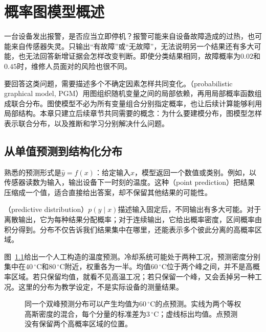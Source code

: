 \chapter{概率图模型概述}
\label{chap:pgm-overview}

一台设备发出报警，是否应当立即停机？报警可能来自设备故障造成的过热，也可能来自传感器失灵。只输出“有故障”或“无故障”，无法说明另一个结果还有多大可能，也无法回答新增证据会怎样改变判断。即使分类结果相同，故障概率为$0.02$和$0.45$时，维修人员面对的风险也很不同。

要回答这类问题，需要描述多个不确定因素怎样共同变化。（probabilistic graphical model, PGM）用图组织随机变量之间的局部依赖，再用局部概率函数组成联合分布。图使模型不必为所有变量组合分别指定概率，也让后续计算能够利用局部结构。本章只建立后续章节共同需要的概念：为什么要建模分布，图模型怎样表示联合分布，以及推断和学习分别解决什么问题。

\section{从单值预测到结构化分布}
\label{sec:pgm-overview-distribution-prediction}

熟悉的预测形式是$\hat y=f(x)$：给定输入$x$，模型返回一个数值或类别。例如，以传感器读数为输入，输出设备下一时刻的温度。这种（point prediction）把结果压缩成一个值，适合直接给出答案，却不保留其他结果的可能性。

（predictive distribution）$p(y\mid x)$描述输入固定后，不同输出有多大可能。对于离散输出，它为每种结果分配概率；对于连续输出，它给出概率密度，区间概率由积分得到。分布不仅告诉我们结果集中在哪里，还能表示多个彼此分离的高概率区域。

图~\ref{fig:pgm-overview-predictive-density}给出一个人工构造的温度预测。冷却系统可能处于两种工况，预测密度分别集中在$40\,^\circ\mathrm{C}$和$80\,^\circ\mathrm{C}$附近，权重各为一半。均值$60\,^\circ\mathrm{C}$位于两个峰之间，并不是高概率区域。若只保留均值，就看不见高温工况；若只保留一个峰，又会丢掉另一种工况。这里的分布为教学设定，不是实际设备的测量结果。

\begin{figure}[htbp]
  \centering
  
  \caption{同一个双峰预测分布可以产生均值为$60\,^\circ\mathrm{C}$的点预测。实线为两个等权高斯密度的混合，每个分量的标准差为$3\,^\circ\mathrm{C}$；虚线标出均值。点预测没有保留两个高概率区域的位置。}
  \label{fig:pgm-overview-predictive-density}
\end{figure}

